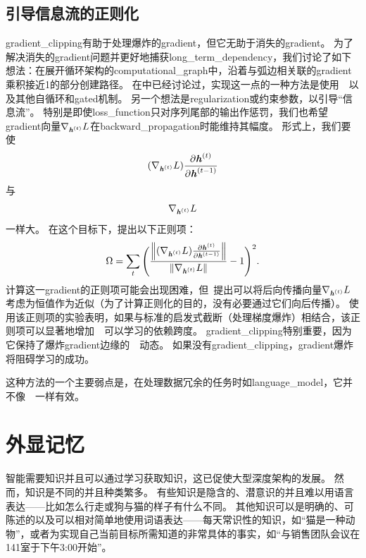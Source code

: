 \subsection{引导信息流的正则化}
\label{sec:regularizing_to_encourage_information_flow}
\gls{gradient_clipping}有助于处理爆炸的\gls{gradient}，但它无助于消失的\gls{gradient}。
为了解决消失的\gls{gradient}问题并更好地捕获\gls{long_term_dependency}，我们讨论了如下想法：在展开循环架构的\gls{computational_graph}中，沿着与弧边相关联的\gls{gradient}乘积接近1的部分创建路径。
在中已经讨论过，实现这一点的一种方法是使用~~以及其他自循环和\gls{gated}机制。
另一个想法是\gls{regularization}或约束参数，以引导``信息流''。
特别是即使\gls{loss_function}只对序列尾部的输出作惩罚，我们也希望\gls{gradient}向量$\nabla_{\boldsymbol{\mathit{h}}^{(t)}} L$在\gls{backward_propagation}时能维持其幅度。
形式上，我们要使
\begin{align}
 (\nabla_{\boldsymbol{\mathit{h}}^{(t)}} L) \frac{\partial \boldsymbol{\mathit{h}}^{(t)}}{\partial \boldsymbol{\mathit{h}}^{(t-1)}}
\end{align}
与
\begin{align}
\nabla_{\boldsymbol{\mathit{h}}^{(t)}} L 
\end{align}
一样大。
在这个目标下，\citet{Pascanu+al-ICML2013-small}提出以下正则项：
\begin{align}
 \Omega = \sum_t \Bigg(  \frac{
 \left\lVert (\nabla_{\boldsymbol{\mathit{h}}^{(t)}} L) \frac{\partial \boldsymbol{\mathit{h}}^{(t)}}{\partial \boldsymbol{\mathit{h}}^{(t-1)}}\right\rVert}
 {\left\lVert\nabla_{\boldsymbol{\mathit{h}}^{(t)}} L\right\rVert} -1 \Bigg)^2.
\end{align}
计算这一\gls{gradient}的正则项可能会出现困难，但~\cite{Pascanu+al-ICML2013-small}提出可以将后向传播向量$\nabla_{\boldsymbol{\mathit{h}}^{(t)}} L$考虑为恒值作为近似（为了计算正则化的目的，没有必要通过它们向后传播）。
使用该正则项的实验表明，如果与标准的启发式截断（处理梯度爆炸）相结合，该正则项可以显著地增加~~可以学习的依赖跨度。
\gls{gradient_clipping}特别重要，因为它保持了爆炸\gls{gradient}边缘的~~动态。
如果没有\gls{gradient_clipping}，\gls{gradient}爆炸将阻碍学习的成功。

这种方法的一个主要弱点是，在处理数据冗余的任务时如\gls{language_model}，它并不像~~一样有效。


\section{外显记忆}
\label{sec:explicit_memory}
智能需要知识并且可以通过学习获取知识，这已促使大型深度架构的发展。
然而，知识是不同的并且种类繁多。
有些知识是隐含的、潜意识的并且难以用语言表达——比如怎么行走或狗与猫的样子有什么不同。
其他知识可以是明确的、可陈述的以及可以相对简单地使用词语表达——每天常识性的知识，如``猫是一种动物''，或者为实现自己当前目标所需知道的非常具体的事实，如``与销售团队会议在141室于下午3:00开始''。


